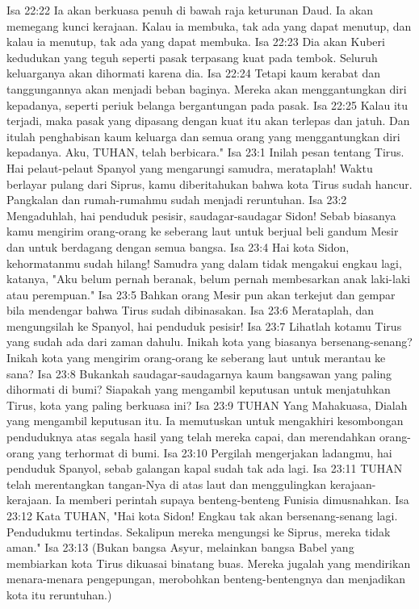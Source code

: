 Isa 22:22  Ia akan berkuasa penuh di bawah raja keturunan Daud. Ia akan memegang kunci kerajaan. Kalau ia membuka, tak ada yang dapat menutup, dan kalau ia menutup, tak ada yang dapat membuka.
Isa 22:23  Dia akan Kuberi kedudukan yang teguh seperti pasak terpasang kuat pada tembok. Seluruh keluarganya akan dihormati karena dia.
Isa 22:24  Tetapi kaum kerabat dan tanggungannya akan menjadi beban baginya. Mereka akan menggantungkan diri kepadanya, seperti periuk belanga bergantungan pada pasak.
Isa 22:25  Kalau itu terjadi, maka pasak yang dipasang dengan kuat itu akan terlepas dan jatuh. Dan itulah penghabisan kaum keluarga dan semua orang yang menggantungkan diri kepadanya. Aku, TUHAN, telah berbicara."
Isa 23:1  Inilah pesan tentang Tirus. Hai pelaut-pelaut Spanyol yang mengarungi samudra, merataplah! Waktu berlayar pulang dari Siprus, kamu diberitahukan bahwa kota Tirus sudah hancur. Pangkalan dan rumah-rumahmu sudah menjadi reruntuhan.
Isa 23:2  Mengaduhlah, hai penduduk pesisir, saudagar-saudagar Sidon! Sebab biasanya kamu mengirim orang-orang ke seberang laut untuk berjual beli gandum Mesir dan untuk berdagang dengan semua bangsa.
Isa 23:4  Hai kota Sidon, kehormatanmu sudah hilang! Samudra yang dalam tidak mengakui engkau lagi, katanya, "Aku belum pernah beranak, belum pernah membesarkan anak laki-laki atau perempuan."
Isa 23:5  Bahkan orang Mesir pun akan terkejut dan gempar bila mendengar bahwa Tirus sudah dibinasakan.
Isa 23:6  Merataplah, dan mengungsilah ke Spanyol, hai penduduk pesisir!
Isa 23:7  Lihatlah kotamu Tirus yang sudah ada dari zaman dahulu. Inikah kota yang biasanya bersenang-senang? Inikah kota yang mengirim orang-orang ke seberang laut untuk merantau ke sana?
Isa 23:8  Bukankah saudagar-saudagarnya kaum bangsawan yang paling dihormati di bumi? Siapakah yang mengambil keputusan untuk menjatuhkan Tirus, kota yang paling berkuasa ini?
Isa 23:9  TUHAN Yang Mahakuasa, Dialah yang mengambil keputusan itu. Ia memutuskan untuk mengakhiri kesombongan penduduknya atas segala hasil yang telah mereka capai, dan merendahkan orang-orang yang terhormat di bumi.
Isa 23:10  Pergilah mengerjakan ladangmu, hai penduduk Spanyol, sebab galangan kapal sudah tak ada lagi.
Isa 23:11  TUHAN telah merentangkan tangan-Nya di atas laut dan menggulingkan kerajaan-kerajaan. Ia memberi perintah supaya benteng-benteng Funisia dimusnahkan.
Isa 23:12  Kata TUHAN, "Hai kota Sidon! Engkau tak akan bersenang-senang lagi. Pendudukmu tertindas. Sekalipun mereka mengungsi ke Siprus, mereka tidak aman."
Isa 23:13  (Bukan bangsa Asyur, melainkan bangsa Babel yang membiarkan kota Tirus dikuasai binatang buas. Mereka jugalah yang mendirikan menara-menara pengepungan, merobohkan benteng-bentengnya dan menjadikan kota itu reruntuhan.)
